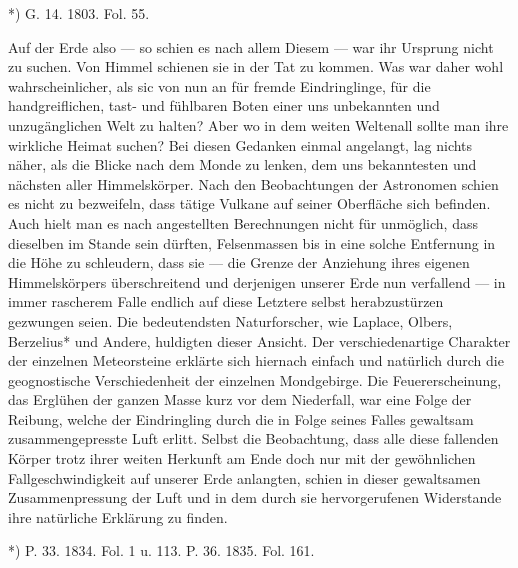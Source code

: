 \documentclass[a4paper, 8pt, oneside, polutonikogreek, german]{article}
\begin{document}
*) G. 14. 1803. Fol. 55.

Auf der Erde also — so schien es nach allem Diesem — war ihr Ursprung nicht zu suchen. Von Himmel schienen sie in der Tat zu kommen. Was war daher wohl wahrscheinlicher, als sic von nun an für fremde Eindringlinge, für die handgreiflichen, tast- und fühlbaren Boten einer uns unbekannten und unzugänglichen Welt zu halten? Aber wo in dem weiten Weltenall sollte man ihre wirkliche Heimat suchen? Bei diesen Gedanken einmal angelangt, lag nichts näher, als die Blicke nach dem Monde zu lenken, dem uns bekanntesten und nächsten aller Himmelskörper. Nach den Beobachtungen der Astronomen schien es nicht zu bezweifeln, dass tätige Vulkane auf seiner Oberfläche sich befinden. Auch hielt man es nach angestellten Berechnungen nicht für unmöglich, dass dieselben im Stande sein dürften, Felsenmassen bis in eine solche Entfernung in die Höhe zu schleudern, dass sie — die Grenze der Anziehung ihres eigenen Himmelskörpers überschreitend und derjenigen unserer Erde nun verfallend — in immer rascherem Falle endlich auf diese Letztere selbst herabzustürzen gezwungen seien. Die bedeutendsten Naturforscher, wie Laplace, Olbers, Berzelius* und Andere, huldigten dieser Ansicht. Der verschiedenartige Charakter der einzelnen Meteorsteine erklärte sich hiernach einfach und natürlich durch die geognostische Verschiedenheit der einzelnen Mondgebirge. Die Feuererscheinung, das Erglühen der ganzen Masse kurz vor dem Niederfall, war eine Folge der Reibung, welche der Eindringling durch die in Folge seines Falles gewaltsam zusammengepresste Luft erlitt. Selbst die Beobachtung, dass alle diese fallenden Körper trotz ihrer weiten Herkunft am Ende doch nur mit der gewöhnlichen Fallgeschwindigkeit auf unserer Erde anlangten, schien in dieser gewaltsamen Zusammenpressung der Luft und in dem durch sie hervorgerufenen Widerstande ihre natürliche Erklärung zu finden.

*) P. 33. 1834. Fol. 1 u. 113. P. 36. 1835. Fol. 161.
\end{document}
